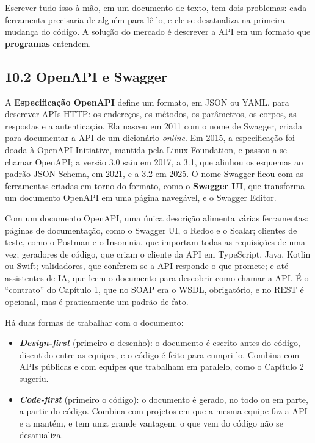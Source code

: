 Escrever tudo isso à mão, em um documento de texto, tem dois problemas: cada ferramenta precisaria de alguém para lê-lo, e ele se desatualiza na primeira mudança do código. A solução do mercado é descrever a API em um formato que \textbf{programas} entendem.

\subsection{10.2 OpenAPI e Swagger}

A \textbf{Especificação OpenAPI} define um formato, em JSON ou YAML, para descrever APIs HTTP: os endereços, os métodos, os parâmetros, os corpos, as respostas e a autenticação. Ela nasceu em 2011 com o nome de Swagger, criada para documentar a API de um dicionário \textit{online}. Em 2015, a especificação foi doada à OpenAPI Initiative, mantida pela Linux Foundation, e passou a se chamar OpenAPI; a versão 3.0 saiu em 2017, a 3.1, que alinhou os esquemas ao padrão JSON Schema, em 2021, e a 3.2 em 2025. O nome Swagger ficou com as ferramentas criadas em torno do formato, como o \textbf{Swagger UI}, que transforma um documento OpenAPI em uma página navegável, e o Swagger Editor.

Com um documento OpenAPI, uma única descrição alimenta várias ferramentas: páginas de documentação, como o Swagger UI, o Redoc e o Scalar; clientes de teste, como o Postman e o Insomnia, que importam todas as requisições de uma vez; geradores de código, que criam o cliente da API em TypeScript, Java, Kotlin ou Swift; validadores, que conferem se a API responde o que promete; e até assistentes de IA, que leem o documento para descobrir como chamar a API. É o ``contrato'' do Capítulo 1, que no SOAP era o WSDL, obrigatório, e no REST é opcional, mas é praticamente um padrão de fato.

Há duas formas de trabalhar com o documento:

\begin{itemize}
  \item \textbf{\textit{Design-first}} (primeiro o desenho): o documento é escrito antes do código, discutido entre as equipes, e o código é feito para cumpri-lo. Combina com APIs públicas e com equipes que trabalham em paralelo, como o Capítulo 2 sugeriu.
  \item \textbf{\textit{Code-first}} (primeiro o código): o documento é gerado, no todo ou em parte, a partir do código. Combina com projetos em que a mesma equipe faz a API e a mantém, e tem uma grande vantagem: o que vem do código não se desatualiza.
\end{itemize}

